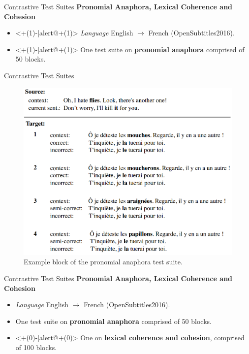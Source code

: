 \begin{frame}{Contrastive Test Suites}
	\textbf{Pronomial Anaphora, Lexical Coherence and Cohesion} \cite{bawden_evaluating_2018}
	\begin{itemize}
		\item<+(1)-|alert@+(1)> \textit{Language} English $\rightarrow$ French (OpenSubtitles2016).
		\item<+(1)-|alert@+(1)> One test suite on \textbf{pronomial anaphora} comprised of 50 blocks.
	\end{itemize}
\end{frame}

\begin{frame}{Contrastive Test Suites}
	\begin{figure}
		\centering
		\includegraphics[width=0.59\linewidth]{Images/anaphora_test_suite}
		\caption{Example block of the pronomial anaphora test suite.}
		\label{fig:anaphoratestsuite}
	\end{figure}
\end{frame}

\begin{frame}{Contrastive Test Suites}
	\textbf{Pronomial Anaphora, Lexical Coherence and Cohesion} \cite{bawden_evaluating_2018}
	\begin{itemize}
		\item \textit{Language} English $\rightarrow$ French (OpenSubtitles2016).
		\item One test suite on \textbf{pronomial anaphora} comprised of 50 blocks.
		\item<+(0)-|alert@+(0)> One on \textbf{lexical coherence and cohesion}, comprised of 100 blocks.
	\end{itemize}
\end{frame}


